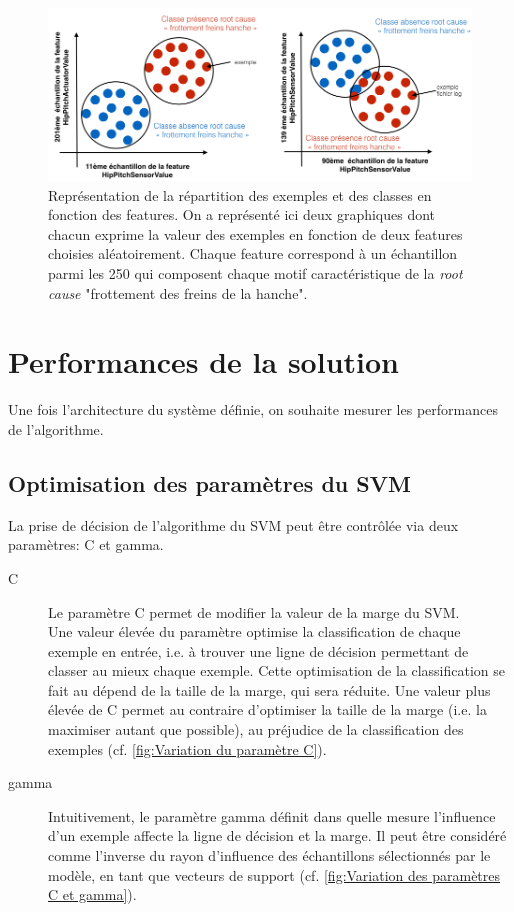 \begin{figure}[h]
	\centering\includegraphics[width=15cm]{images/classes_sys.png}
	\caption[Représentation de la répartition des exemples et des classes en fonction des features,  approche fonctionnelle]{Représentation de la répartition des exemples et des classes en fonction des features. On a représenté ici deux graphiques dont chacun exprime la valeur des exemples en fonction de deux features choisies aléatoirement. Chaque feature correspond à un échantillon parmi les 250 qui composent chaque motif caractéristique de la \emph{root cause} "frottement des freins de la hanche".}
	\label{fig:Courbe de probabilité de la root cause "frottement des freins de la hanche"}
\end{figure}


\section{Performances de la solution}
\label{Automatisation du processus d'investigation: Performances de la solution}
Une fois l'architecture du système définie, on souhaite mesurer les performances de l'algorithme.

\subsection{Optimisation des paramètres du SVM}
\label{Industrialisation du produit: Performances de la solution:Optimisation des paramètres du SVM}
La prise de décision de l'algorithme du SVM peut être contrôlée via deux paramètres: C et gamma.
\begin{description}
	\item [C] Le paramètre C permet de modifier la valeur de la marge du SVM. \\
	Une valeur élevée du paramètre optimise la classification de chaque exemple en entrée, i.e. à trouver une ligne de décision permettant de classer au mieux chaque exemple. Cette optimisation de la classification se fait au dépend de la taille de la marge, qui sera réduite. Une valeur plus élevée de C permet au contraire d'optimiser la taille de la marge (i.e. la maximiser autant que possible), au préjudice de la classification des exemples (cf. \ref{fig:Variation du paramètre C}).
	\item [gamma] Intuitivement, le paramètre gamma définit dans quelle mesure l'influence d'un exemple affecte la ligne de décision et la marge. Il peut être considéré comme l'inverse du rayon d'influence des échantillons sélectionnés par le modèle, en tant que vecteurs de support (cf.  \ref{fig:Variation des paramètres C et gamma}).
\end{description}


